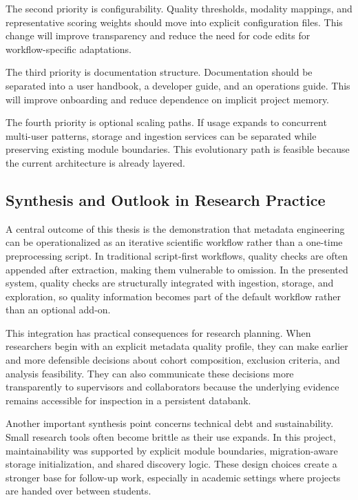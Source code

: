The second priority is configurability. Quality thresholds, modality mappings, and representative scoring weights should move into explicit configuration files. This change will improve transparency and reduce the need for code edits for workflow-specific adaptations.

The third priority is documentation structure. Documentation should be separated into a user handbook, a developer guide, and an operations guide. This will improve onboarding and reduce dependence on implicit project memory.

The fourth priority is optional scaling paths. If usage expands to concurrent multi-user patterns, storage and ingestion services can be separated while preserving existing module boundaries. This evolutionary path is feasible because the current architecture is already layered.

\subsection{Synthesis and Outlook in Research Practice}
A central outcome of this thesis is the demonstration that metadata engineering can be operationalized as an iterative scientific workflow rather than a one-time preprocessing script. In traditional script-first workflows, quality checks are often appended after extraction, making them vulnerable to omission. In the presented system, quality checks are structurally integrated with ingestion, storage, and exploration, so quality information becomes part of the default workflow rather than an optional add-on.

This integration has practical consequences for research planning. When researchers begin with an explicit metadata quality profile, they can make earlier and more defensible decisions about cohort composition, exclusion criteria, and analysis feasibility. They can also communicate these decisions more transparently to supervisors and collaborators because the underlying evidence remains accessible for inspection in a persistent databank.

Another important synthesis point concerns technical debt and sustainability. Small research tools often become brittle as their use expands. In this project, maintainability was supported by explicit module boundaries, migration-aware storage initialization, and shared discovery logic. These design choices create a stronger base for follow-up work, especially in academic settings where projects are handed over between students.

